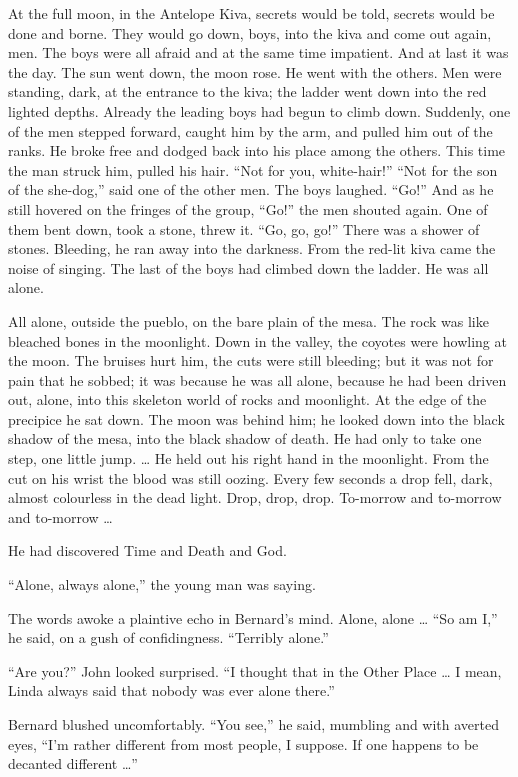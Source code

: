 \documentclass[12pt]{report}
\begin{document}
At the full moon, in the Antelope Kiva, secrets would be told, secrets
would be done and borne. They would go down, boys, into the kiva and
come out again, men. The boys were all afraid and at the same time
impatient. And at last it was the day. The sun went down, the moon rose.
He went with the others. Men were standing, dark, at the entrance to the
kiva; the ladder went down into the red lighted depths. Already the
leading boys had begun to climb down. Suddenly, one of the men stepped
forward, caught him by the arm, and pulled him out of the ranks. He
broke free and dodged back into his place among the others. This time
the man struck him, pulled his hair. ``Not for you, white-hair!'' ``Not
for the son of the she-dog,'' said one of the other men. The boys
laughed. ``Go!'' And as he still hovered on the fringes of the group,
``Go!'' the men shouted again. One of them bent down, took a stone,
threw it. ``Go, go, go!'' There was a shower of stones. Bleeding, he ran
away into the darkness. From the red-lit kiva came the noise of singing.
The last of the boys had climbed down the ladder. He was all alone.

All alone, outside the pueblo, on the bare plain of the mesa. The rock
was like bleached bones in the moonlight. Down in the valley, the
coyotes were howling at the moon. The bruises hurt him, the cuts were
still bleeding; but it was not for pain that he sobbed; it was because
he was all alone, because he had been driven out, alone, into this
skeleton world of rocks and moonlight. At the edge of the precipice he
sat down. The moon was behind him; he looked down into the black shadow
of the mesa, into the black shadow of death. He had only to take one
step, one little jump. \ldots{} He held out his right hand in the
moonlight. From the cut on his wrist the blood was still oozing. Every
few seconds a drop fell, dark, almost colourless in the dead light.
Drop, drop, drop. To-morrow and to-morrow and to-morrow \ldots{}

He had discovered Time and Death and God.

``Alone, always alone,'' the young man was saying.

The words awoke a plaintive echo in Bernard's mind. Alone, alone
\ldots{} ``So am I,'' he said, on a gush of confidingness. ``Terribly
alone.''

``Are you?'' John looked surprised. ``I thought that in the Other Place
\ldots{} I mean, Linda always said that nobody was ever alone there.''

Bernard blushed uncomfortably. ``You see,'' he said, mumbling and with
averted eyes, ``I'm rather different from most people, I suppose. If one
happens to be decanted different \ldots{}''
\end{document}
